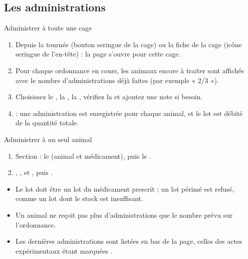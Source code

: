 \documentclass[11pt,a4paper]{article}
\begin{document}
\subsection{Les administrations}
\begin{procedure}{Administrer à toute une cage}
\begin{enumerate}
  \item Depuis la tournée (bouton seringue de la cage) ou la fiche de la
    cage (icône seringue de l'en-tête) : la page 
    s'ouvre pour cette cage.
  \item Pour chaque ordonnance en cours, les animaux encore à traiter sont
    affichés avec le nombre d'administrations déjà faites (par exemple
    « 2/3 »).
  \item Choisissez le , la , la
    , vérifiez la  et ajoutez une note si
    besoin.
  \item {} : une administration est enregistrée pour chaque
    animal, et le lot est débité de la quantité totale.
\end{enumerate}
\end{procedure}
\begin{procedure}{Administrer à un seul animal}
\begin{enumerate}
  \item Section  : le  (animal et médicament), puis le .
  \item {}, ,  et , puis
    .
\end{enumerate}
\end{procedure}
\begin{regle}
\begin{itemize}
  \item Le lot doit être un lot du médicament prescrit ; un lot périmé est
    refusé, comme un lot dont le stock est insuffisant.
  \item Un animal ne reçoit pas plus d'administrations que le nombre prévu
    sur l'ordonnance.
  \item Les dernières administrations sont listées en bas de la page,
    celles des actes expérimentaux étant marquées .
\end{itemize}
\end{regle}
\end{document}
